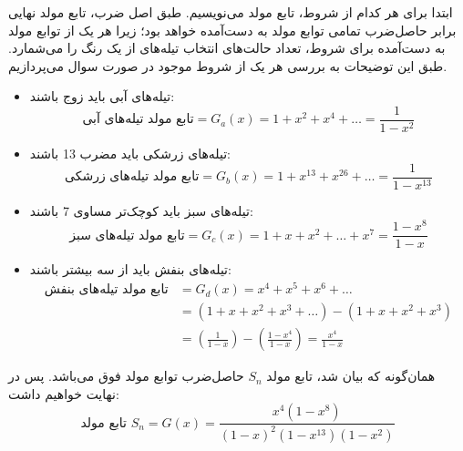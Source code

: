 \p
 ابتدا برای هر کدام از شروط، تابع مولد می‌نویسیم. طبق اصل ضرب،
  تابع مولد نهایی برابر حاصل‌ضرب تمامی  توابع مولد به دست‌آمده خواهد بود؛
    زیرا هر یک از توابع مولد به دست‌آمده برای شروط، تعداد حالت‌های انتخاب‌ تیله‌های از یک رنگ را می‌شمارد.  
   طبق این توضیحات به بررسی هر یک از شروط موجود در صورت سوال می‌پردازیم.
\begin{itemize}
    \item 
    تیله‌های آبی باید زوج باشند:
    $$\text{تابع مولد تیله‌های آبی} = G_a(x) = 1 + x^2 + x^4 + \ldots = \frac{1}{1-x^2}$$
    \item
    تیله‌های زرشکی باید مضرب 13 باشند:
    $$\text{تابع مولد تیله‌های زرشکی} = G_b(x) = 1 + x^{13} + x^{26} + \ldots = \frac{1}{1-x^{13}}$$
    \item
    تیله‌های سبز باید کوچک‌تر مساوی 7 باشند:
    $$\text{تابع مولد تیله‌های سبز} = G_c(x) = 1 + x + x^2 + \ldots + x^7 = \frac{1-x^8}{1-x}$$
    \item
    تیله‌های بنفش باید از سه بیشتر باشند:
    \begin{align*}
    \text{تابع مولد تیله‌های بنفش} &= G_d(x) = x^4 + x^5 + x^6 + \ldots\\
    &= (1+x+x^2+x^3+\ldots) - (1 + x + x^2 + x^3)\\
    &= (\frac{1}{1-x}) - (\frac{1-x^4}{1-x}) = \frac{x^4}{1-x}
    \end{align*}
\end{itemize}
\p
  همان‌گونه که بیان شد، تابع مولد
$S_n$
حاصل‌ضرب توابع مولد فوق می‌باشد. پس در نهایت خواهیم داشت:
$$\text{تابع مولد $S_n$} = G(x) = \frac{x^4(1-x^8)}{(1-x)^2(1-x^{13})(1-x^{2})}$$